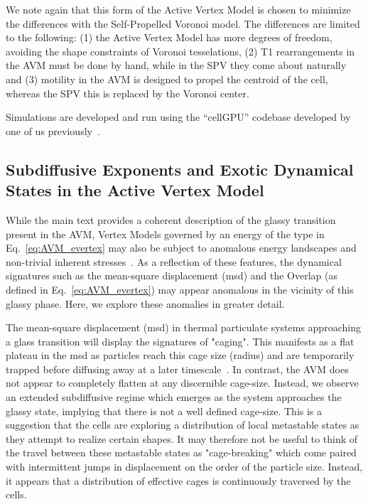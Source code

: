\documentclass[
reprint
,aps
,amssymb
,amsmath
,superscriptaddress
]{revtex4-1}
\begin{document}
We note again that this form of the Active Vertex Model is chosen to minimize the differences with the Self-Propelled Voronoi model. The differences are limited to the following: (1) the Active Vertex Model has more degrees of freedom, avoiding the shape constraints of Voronoi tesselations, (2) T1 rearrangements in the AVM must be done by hand, while in the SPV they come about naturally and (3) motility in the AVM is designed to propel the centroid of the cell, whereas the SPV this is replaced by the Voronoi center. 

Simulations are developed and run using the ``cellGPU'' codebase developed by one of us previously~\cite{Sussman2017-1}.


\subsection{Subdiffusive Exponents and Exotic Dynamical States in the Active Vertex Model \label{app:avm_rheology}}

While the main text provides a coherent description of the glassy transition present in the AVM, Vertex Models governed by an energy of the type in Eq.~\ref{eq:AVM_evertex} may also be subject to anomalous energy landscapes and non-trivial inherent stresses~\cite{Sussman2017-2, Sussman2018-2}. As a reflection of these features, the dynamical signatures such as the mean-square displacement (msd) and the Overlap (as defined in Eq.~\ref{eq:AVM_evertex}) may appear anomalous in the vicinity of this glassy phase. Here, we explore these anomalies in greater detail.  

The mean-square displacement (msd) in thermal particulate systems approaching a glass transition will display the signatures of "caging". This manifests as a flat plateau in the msd as particles reach this cage size (radius) and are temporarily trapped before diffusing away at a later timescale~\cite{Berthier2011, Weeks2002}. In contrast, the AVM does not appear to completely flatten at any discernible cage-size. Instead, we observe an extended subdiffusive regime which emerges as the system approaches the glassy state, implying that there is not a well defined cage-size. This is a suggestion that the cells are exploring a distribution of local metastable states as they attempt to realize certain shapes. It may therefore not be useful to think of the travel between these metastable states as "cage-breaking" which come paired with intermittent jumps in displacement on the order of the particle size. Instead, it appears that a distribution of effective cages is continuously traversed by the cells. 
\end{document}

